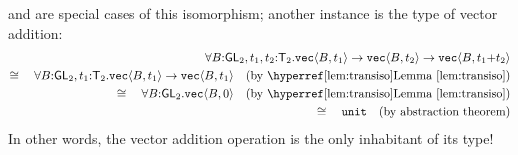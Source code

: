 
 and  are special cases of
this isomorphism; another instance is the type of vector addition:
\begin{align*}
\forall B\mathord:\SynGL{2}, t_1, t_2\mathord:\SynTransl{2}.\tyPrim{vec}{B,t_1}\to\tyPrim{vec}{B,t_2}\to\tyPrim{vec}{B,t_1\mathord+t_2}\\
\cong\quad\forall B\mathord:\SynGL{2}, t_1\mathord:\SynTransl{2}.\tyPrim{vec}{B,t_1}\to\tyPrim{vec}{B,t_1}
\quad (\text{by~\lemref{lem:transiso}})\\
\cong\quad\forall B\mathord:\SynGL{2}.\tyPrim{vec}{B,0} \quad (\text{by~\lemref{lem:transiso}})\\
\cong\quad\tyUnit\quad(\text{by abstraction theorem})
\end{align*}
In other words, the vector addition operation is the only inhabitant of its type!
